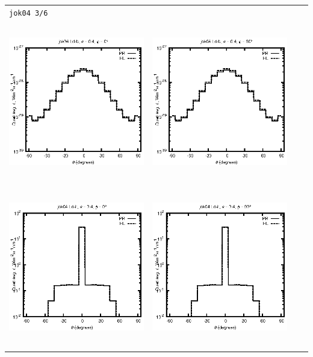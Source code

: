 \documentclass[10pt,a4paper]{article}
\begin{document}
\begin{adjustwidth}{-1.2in}{-1.2in}
\begin{tabular}{c c c c}
\multicolumn{4}{l}{\texttt{jok04 3/6}} \\
\includegraphics[height=7cm]{../eps/jok04_Ld_b_fwd.eps} &
\includegraphics[height=7cm]{../eps/jok04_Ld_b_cross.eps} \\
\includegraphics[height=7cm]{../eps/jok04_Ld_it_fwd.eps} &
\includegraphics[height=7cm]{../eps/jok04_Ld_it_cross.eps} \\

\end{tabular}
\end{adjustwidth}
\end{document}
